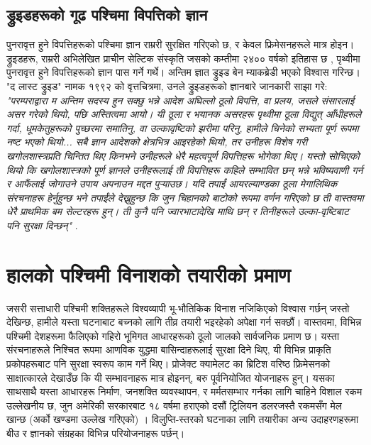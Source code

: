 \documentclass[10pt,twocolumn,letterpaper]{article}
\begin{document}
\subsection{ड्रुइडहरूको गूढ पश्चिमा विपत्तिको ज्ञान}

पुनरावृत्त हुने विपत्तिहरूको पश्चिमा ज्ञान राम्ररी सुरक्षित गरिएको छ, र केवल फ्रिमेसनहरूले मात्र होइन। ड्रुइडहरू, राम्ररी अभिलेखित प्राचीन सेल्टिक संस्कृति जसको कम्तीमा २४०० वर्षको इतिहास छ \cite{7}, पृथ्वीमा पुनरावृत्त हुने विपत्तिहरूको ज्ञान पास गर्ने गर्थे। अन्तिम ज्ञात ड्रुइड बेन म्याकब्रेडी भएको विश्वास गरिन्छ। "द लास्ट ड्रुइड" नामक १९९२ को वृत्तचित्रमा, उनले ड्रुइडहरूको ज्ञानबारे जानकारी साझा गरे: \textit{"परम्पराद्वारा म अन्तिम सदस्य हुन सक्छु भन्ने आदेश अघिल्लो ठूलो विपत्ति, वा प्रलय, जसले संसारलाई असर गरेको थियो, पछि अस्तित्वमा आयो। यी ठूला र भयानक असरहरू पृथ्वीमा ठूला विद्युत् आँधीहरूले गर्दा, धूमकेतुहरूको पुच्छरमा समातिनु, वा उल्कावृष्टिको झरीमा परिनु, हामीले चिनेको सभ्यता पूर्ण रूपमा नष्ट भएको थियो... सबै ज्ञान आदेशको क्षेत्रभित्र आइरहेको थियो, तर उनीहरू विशेष गरी खगोलशास्त्रप्रति चिन्तित थिए किनभने उनीहरूले धेरै महत्वपूर्ण विपत्तिहरू भोगेका थिए। यस्तो सोचिएको थियो कि खगोलशास्त्रको पूर्ण ज्ञानले उनीहरूलाई ती विपत्तिहरू कहिले सम्भावित छन् भन्ने भविष्यवाणी गर्न र आफैंलाई जोगाउने उपाय अपनाउन मद्दत पुर्‍याउछ। यदि तपाईं आयरल्याण्डका ठूला मेगालिथिक संरचनाहरू हेर्नुहुन्छ भने तपाईंले देख्नुहुन्छ कि जुन चिहानको बाटोको रूपमा वर्णन गरिएको छ ती वास्तवमा धेरै प्राथमिक बम सेल्टरहरू हुन्। ती कुनै पनि ज्वारभाटादेखि माथि छन् र तिनीहरूले उल्का-वृष्टिबाट पनि सुरक्षा दिन्छन्"} \cite{8,9}.

\section{हालको पश्चिमी विनाशको तयारीको प्रमाण}

जसरी सत्ताधारी पश्चिमी शक्तिहरूले विश्वव्यापी भू-भौतिकिक विनाश नजिकिएको विश्वास गर्छन् जस्तो देखिन्छ, हामीले यस्ता घटनाबाट बच्नको लागि तीव्र तयारी भइरहेको अपेक्षा गर्न सक्छौं। वास्तवमा, विभिन्न पश्चिमी देशहरूमा फैलिएको गहिरो भूमिगत आधारहरूको ठूलो जालको सार्वजनिक प्रमाण छ। यस्ता संरचनाहरूले निश्चित रूपमा आणविक युद्धमा बासिन्दाहरूलाई सुरक्षा दिने थिए, यी विभिन्न प्राकृति प्रकोपहरूबाट पनि सुरक्षा स्वरूप काम गर्ने थिए। प्रोजेक्ट क्यामेलट \cite{4,6} का ब्रिटिश वरिष्ठ फ्रिमेसनको साक्षात्कारले देखाउँछ कि यी सम्भावनाहरू मात्र होइनन्, बरु पूर्वनियोजित योजनाहरू हुन्। यसका साथसाथै यस्ता आधारहरू निर्माण, जनशक्ति व्यवस्थापन, र मर्मतसम्भार गर्नका लागि चाहिने विशाल रकम उल्लेखनीय छ, जुन अमेरिकी सरकारबाट १८ वर्षमा हराएको दसौं ट्रिलियन डलरजस्तै रकमसँग मेल खान्छ (अर्को खण्डमा उल्लेख गरिएको) \cite{11,12,13}। विलुप्ति-स्तरको घटनाका लागि तयारीका अन्य उदाहरणहरूमा बीउ र ज्ञानको संग्रहका विभिन्न परियोजनाहरू पर्छन्।
\end{document}
